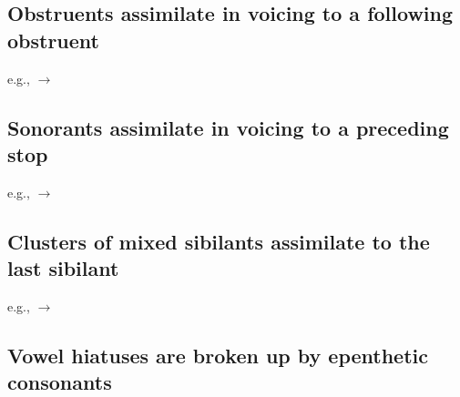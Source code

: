 \subsection{Obstruents assimilate in voicing to a following obstruent}

e.g.,   $\to$ 

\subsection{Sonorants assimilate in voicing to a preceding stop}

e.g.,   $\to$ 

\subsection{Clusters of mixed sibilants assimilate to the last sibilant}

e.g.,   $\to$ 

\subsection{Vowel hiatuses are broken up by epenthetic consonants}

